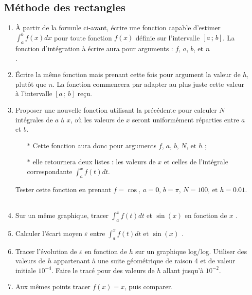 \subsection{Méthode des rectangles}
\begin{enumerate}
\item À  partir de  la formule ci-avant,  écrire une  fonction capable
  d'estimer $\int_a^b  f(x)dx$ pour toute fonction  $f(x)$ définie sur
  l'intervalle $[a\,;\,b]$.  La fonction  d'intégration
  à   écrire  aura   pour  arguments   :   $f$,  $a$,   $b$,  et   $n$
  \\ .
\item Écrire la même fonction mais prenant cette fois pour argument la
  valeur de  $h$, plutôt que $n$.  La  fonction commencera par  adapter au  plus juste
  cette valeur à l'intervalle $[a\,;\,b]$ reçu.
\item Proposer  une nouvelle  fonction utilisant la précédente
  pour calculer  $N$ intégrales de  $a$ à $x$,  où les valeurs  de $x$
  seront  uniformément  réparties  entre  $a$ et  $b$.
  \begin{itemize}
  \item[$\ast$] Cette fonction aura donc  pour arguments $f$, $a$, $b$,
    $N$, et $h$ ;
  \item[$\ast$] elle retournera deux listes :  les valeurs   de  $x$   et
    celles  de   l'intégrale  correspondante $\int_a^xf(t)dt$.
  \end{itemize}
  Tester cette fonction en prenant $f=\cos$, $a=0$, $b=\pi$, $N=100$, et
  $h=0.01$.\\
  \\
\item  Sur un même graphique, tracer $\int_a^xf(t)dt$ et $\sin(x)$ en fonction de $x$
  .
\item  Calculer  l'écart  moyen $\varepsilon$ entre  $\int_a^xf(t)dt$  et  $\sin(x)$
  .
\item  Tracer l'évolution  de  $\varepsilon$  en fonction  de  $h$ sur  un
  graphique   log/log. Utiliser  des valeurs  de  $h$  appartenant à  une  suite
  géométrique de  raison 4 et  de valeur initiale $10^{-4}$.  Faire le
  tracé pour des valeurs de $h$ allant jusqu'à $10^{-2}$.
\item Aux   mêmes  points   tracer  $f(x)=x$,   puis  comparer.

  
\end{enumerate}

